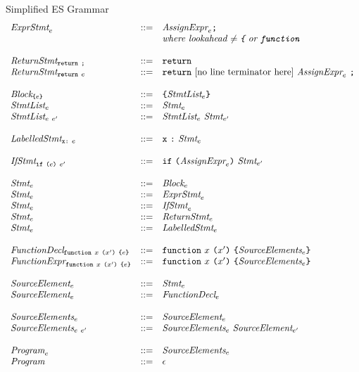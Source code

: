 \documentclass[preprint,10pt]{sigplanconf}
\begin{document}
\begin{displayfigure*}{\label{fig:grammar}Simplified ES Grammar}
\[\begin{array}{lcl}
  \textit{ExprStmt}_{e} &::=&
  \textit{AssignExpr}_{e} \texttt{;}
  \\ 
  &&  \textit{where lookahead \( \not =
    \texttt{\{} \) or \( \texttt{function} \)}
  \\ \\
  \textit{ReturnStmt}_{\texttt{return}~\texttt{;}} &::=&
  \texttt{return}
  \\
  \textit{ReturnStmt}_{\texttt{return}~e} &::=&
  \texttt{return}~\textrm{[no line terminator
    here]}~\textit{AssignExpr}_{e}~\texttt{;}
  \\ \\
  \textit{Block}_{\texttt{\{}e\texttt{\}}} &::=&
  \texttt{\{} \textit{StmtList}_{e} \texttt{\}} 
  \\
  \textit{StmtList}_{e} &::=&
  \textit{Stmt}_{e}
  \\
  \textit{StmtList}_{e~e'} &::=&
  \textit{StmtList}_{e}~
  \textit{Stmt}_{e'}
  \\ \\
  \textit{LabelledStmt}_{\texttt{x}\texttt{:}~e} &::=&
  \texttt{x}~\texttt{:}~\textit{Stmt}_{e}
  \\ \\
  \textit{IfStmt}_{\texttt{if}~\texttt{(}e\texttt{)}~e'} &::=&
  \texttt{if}~\texttt{(}\textit{AssignExpr}_{e}\texttt{)}~\textit{Stmt}_{e'}
  \\ \\
  \textit{Stmt}_{e} &::=& \textit{Block}_{e}
  \\
  \textit{Stmt}_{e} &::=& \textit{ExprStmt}_{e}
  \\
  \textit{Stmt}_{e} &::=& \textit{IfStmt}_{e}
  \\
  \textit{Stmt}_{e} &::=& \textit{ReturnStmt}_{e}
  \\
  \textit{Stmt}_{e} &::=& \textit{LabelledStmt}_{e}
  \\ \\
  \textit{FunctionDecl}_{\texttt{function}~x~\texttt{(}x'\texttt{)}~\texttt{\{}e\texttt{\}}} 
  &::=&
  \texttt{function}~x~\texttt{(}x'\texttt{)}~
  \texttt{\{}\textit{SourceElements}_{e}\texttt{\}}
  \\
  \textit{FunctionExpr}_{\texttt{function}~x~\texttt{(}x'\texttt{)}~\texttt{\{}e\texttt{\}}} 
  &::=&
  \texttt{function}~x~\texttt{(}x'\texttt{)}~
  \texttt{\{}\textit{SourceElements}_{e}\texttt{\}}
  \\ \\
  \textit{SourceElement}_{e} &::=& \textit{Stmt}_{e} 
  \\
  \textit{SourceElement}_{e} &::=& \textit{FunctionDecl}_{e}
  \\ \\

  \textit{SourceElements}_{e} &::=& \textit{SourceElement}_{e}
  \\
  \textit{SourceElements}_{e~e'} &::=& \textit{SourceElements}_{e}~\textit{SourceElement}_{e'}
  \\ \\
  \textit{Program}_{e} &::=& \textit{SourceElements}_{e}
  \\
  \textit{Program}_{} &::=& \epsilon
\end{array}
\]  
\end{displayfigure*}
\end{document}
